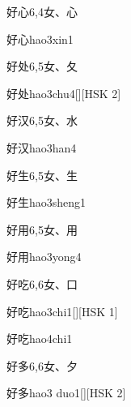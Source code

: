 \begin{entry}{好心}{6,4}{⼥、⼼}
  \begin{phonetics}{好心}{hao3xin1}
  \end{phonetics}
\end{entry}

\begin{entry}{好处}{6,5}{⼥、⼡}
  \begin{phonetics}{好处}{hao3chu4}[][HSK 2]
  \end{phonetics}
\end{entry}

\begin{entry}{好汉}{6,5}{⼥、⽔}
  \begin{phonetics}{好汉}{hao3han4}
  \end{phonetics}
\end{entry}

\begin{entry}{好生}{6,5}{⼥、⽣}
  \begin{phonetics}{好生}{hao3sheng1}
  \end{phonetics}
\end{entry}

\begin{entry}{好用}{6,5}{⼥、⽤}
  \begin{phonetics}{好用}{hao3yong4}
  \end{phonetics}
\end{entry}

\begin{entry}{好吃}{6,6}{⼥、⼝}
  \begin{phonetics}{好吃}{hao3chi1}[][HSK 1]
  \end{phonetics}
  \begin{phonetics}{好吃}{hao4chi1}
  \end{phonetics}
\end{entry}

\begin{entry}{好多}{6,6}{⼥、⼣}
  \begin{phonetics}{好多}{hao3 duo1}[][HSK 2]
  \end{phonetics}
\end{entry}

